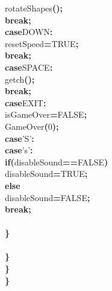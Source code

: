 \documentclass[a4paper, 10pt]{article}
\newcommand\SPC{\hspace*{0.6em}}
\newcommand{\CppACharacter}[1]{#1}
\newcommand{\CppAIdentifier}[1]{#1}
\newcommand{\CppANumber}[1]{\textcolor[rgb]{0.5,0,0.5}{#1}}
\newcommand{\CppAReservedWord}[1]{\textbf{#1}}
\newcommand{\CppASpace}[1]{\colorbox[rgb]{1,1,1}{#1}}
\newcommand{\CppASymbol}[1]{\textbf{\textcolor[rgb]{1,0,0}{#1}}}
\begin{document}
\begin{ttfamily}
\CppASpace{\SPC \SPC \SPC \SPC }\CppAIdentifier{rotateShapes}\CppASymbol{(}\CppASymbol{)}\CppASymbol{;}\\
\CppASpace{\SPC \SPC \SPC \SPC }\CppAReservedWord{break}\CppASymbol{;}\\
\CppASpace{\SPC \SPC \SPC \SPC }\CppAReservedWord{case}\CppASpace{\SPC }\CppAIdentifier{DOWN}\CppASymbol{:}\\
\CppASpace{\SPC \SPC \SPC \SPC \SPC }\CppAIdentifier{resetSpeed}\CppASymbol{=}\CppAIdentifier{TRUE}\CppASymbol{;}\\
\CppASpace{\SPC \SPC \SPC \SPC }\CppAReservedWord{break}\CppASymbol{;}\\
\CppASpace{\SPC \SPC \SPC \SPC }\CppAReservedWord{case}\CppASpace{\SPC }\CppAIdentifier{SPACE}\CppASymbol{:}\\
\CppASpace{\SPC \SPC \SPC \SPC \SPC }\CppAIdentifier{getch}\CppASymbol{(}\CppASymbol{)}\CppASymbol{;}\\
\CppASpace{\SPC \SPC \SPC \SPC }\CppAReservedWord{break}\CppASymbol{;}\\
\CppASpace{\SPC \SPC \SPC \SPC }\CppAReservedWord{case}\CppASpace{\SPC }\CppAIdentifier{EXIT}\CppASymbol{:}\\
\CppASpace{\SPC \SPC \SPC \SPC \SPC }\CppAIdentifier{isGameOver}\CppASymbol{=}\CppAIdentifier{FALSE}\CppASymbol{;}\\
\CppASpace{\SPC \SPC \SPC \SPC \SPC }\CppAIdentifier{GameOver}\CppASymbol{(}\CppANumber{0}\CppASymbol{)}\CppASymbol{;}\\
\CppASpace{\SPC \SPC \SPC \SPC }\CppAReservedWord{case}\CppASpace{\SPC }\CppACharacter{'S'}\CppASymbol{:}\\
\CppASpace{\SPC \SPC \SPC \SPC }\CppAReservedWord{case}\CppASpace{\SPC }\CppACharacter{'s'}\CppASymbol{:}\\
\CppASpace{\SPC \SPC \SPC \SPC \SPC }\CppAReservedWord{if}\CppASymbol{(}\CppAIdentifier{disableSound}\CppASymbol{==}\CppAIdentifier{FALSE}\CppASymbol{)}\\
\CppASpace{\SPC \SPC \SPC \SPC \SPC \SPC }\CppAIdentifier{disableSound}\CppASymbol{=}\CppAIdentifier{TRUE}\CppASymbol{;}\\
\CppASpace{\SPC \SPC \SPC \SPC \SPC }\CppAReservedWord{else}\\
\CppASpace{\SPC \SPC \SPC \SPC \SPC \SPC }\CppAIdentifier{disableSound}\CppASymbol{=}\CppAIdentifier{FALSE}\CppASymbol{;}\\
\CppASpace{\SPC \SPC \SPC \SPC }\CppAReservedWord{break}\CppASymbol{;}\\
\\
\CppASpace{\SPC \SPC \SPC }\CppASymbol{\}}\\
\\
\CppASpace{\SPC \SPC }\CppASymbol{\}}\\
\CppASpace{\SPC }\CppASymbol{\}}\\
\CppASymbol{\}}\\
\\
\\

\end{ttfamily}
\end{document}
